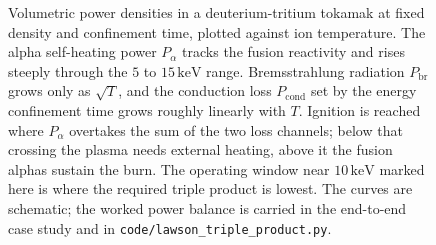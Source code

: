 \begin{figure}[htbp]
\centering
{}
\caption[Tokamak power balance]{Volumetric power densities in a
deuterium-tritium tokamak at fixed density and confinement time, plotted
against ion temperature. The alpha self-heating power $P_\alpha$ tracks the
fusion reactivity and rises steeply through the $5$ to $15\,\si{\kilo
\electronvolt}$ range. Bremsstrahlung radiation $P_{\mathrm{br}}$ grows
only as $\sqrt{T}$, and the conduction loss $P_{\mathrm{cond}}$ set by the
energy confinement time grows roughly linearly with $T$. Ignition is
reached where $P_\alpha$ overtakes the sum of the two loss channels; below
that crossing the plasma needs external heating, above it the fusion
alphas sustain the burn. The operating window near $10\,\si{\kilo
\electronvolt}$ marked here is where the required triple product is lowest.
The curves are schematic; the worked power balance is carried in the
end-to-end case study and in
\texttt{code/lawson\_triple\_product.py}.}
\label{fig:vol04ch13:power-balance}
\end{figure}
